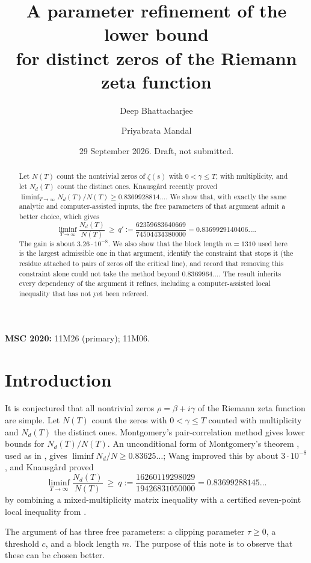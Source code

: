 \documentclass[reqno,11pt]{amsart}
\title[A parameter refinement for distinct zeta zeros]{A parameter refinement of the lower bound\\ for distinct zeros of the Riemann zeta function}
\author{Deep Bhattacharjee}
\author{Priyabrata Mandal}
\date{29 September 2026. Draft, not submitted.}
\numberwithin{equation}{section}
\theoremstyle{plain}
\theoremstyle{remark}
\begin{document}
\begin{abstract}
Let $N(T)$ count the nontrivial zeros of $\zeta(s)$ with $0<\gamma\le T$, with
multiplicity, and let $N_d(T)$ count the distinct ones. Knausg{\aa}rd recently
proved $\liminf_{T\to\infty}N_d(T)/N(T)\ge 0.8369928814\ldots$. We show that,
with exactly the same analytic and computer-assisted inputs, the free
parameters of that argument admit a better choice, which gives
\[
\liminf_{T\to\infty}\frac{N_d(T)}{N(T)}\ \ge\ q' := \frac{62359683640669}{74504434380000}
= 0.8369929140406\ldots .
\]
The gain is about $3.26\cdot10^{-8}$. We also show that the block length
$m=1310$ used here is the largest admissible one in that argument, identify
the constraint that stops it (the residue attached to pairs of zeros off the
critical line), and record that removing this constraint alone could not
take the method beyond $0.8369964\ldots$. The result inherits every
dependency of the argument it refines, including a computer-assisted local
inequality that has not yet been refereed.
\end{abstract}

\maketitle

\noindent\textbf{MSC 2020:} 11M26 (primary); 11M06.

\section{Introduction}

It is conjectured that all nontrivial zeros $\rho=\beta+i\gamma$ of the Riemann
zeta function are simple. Let $N(T)$ count the zeros with $0<\gamma\le T$
counted with multiplicity and $N_d(T)$ the distinct ones. Montgomery's
pair-correlation method \cite{Mon73} gives lower bounds for
$N_d(T)/N(T)$. An unconditional form of Montgomery's theorem \cite{BGST24},
used as in \cite{Cla26,AF26,Lam26}, gives
$\liminf N_d/N\ge 0.83625\ldots$; Wang \cite{Wan26} improved this by about
$3\cdot10^{-8}$, and Knausg{\aa}rd \cite{Kna26} proved
\begin{equation}\label{eq:q}
\liminf_{T\to\infty}\frac{N_d(T)}{N(T)}\ \ge\ q:=\frac{16260119298029}{19426831050000}=0.83699288145\ldots
\end{equation}
by combining a mixed-multiplicity matrix inequality with a certified
seven-point local inequality from \cite{TRM26}.

The argument of \cite{Kna26} has three free parameters: a clipping
parameter $\tau\ge0$, a threshold $c$, and a block length $m$. The purpose of
this note is to observe that these can be chosen better.
\end{document}
